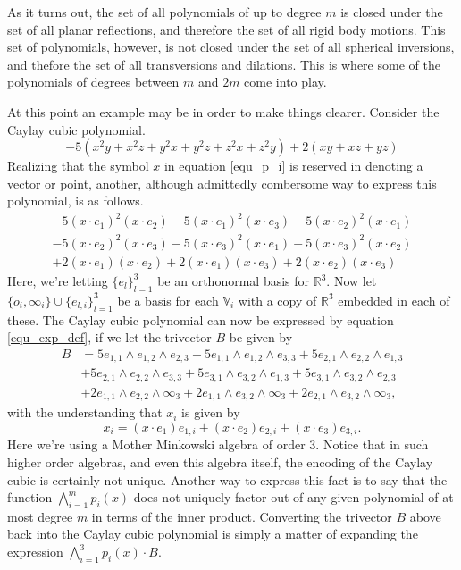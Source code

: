 \documentclass{birkjour}
\theoremstyle{definition}
\theoremstyle{remark}
\numberwithin{equation}{section}
\newcommand{\R}{\mathbb{R}}
\newcommand{\V}{\mathbb{V}}
\newcommand{\nvai}{\infty}
\newcommand{\nvao}{o}
\begin{document}
As it turns out, the set of all polynomials of up to degree $m$ is closed under
the set of all planar reflections, and therefore the set of all
rigid body motions.  This set of polynomials, however, is not closed under the
set of all spherical inversions, and thefore the set of all
transversions and dilations.  This is where some of the polynomials of degrees
between $m$ and $2m$ come into play.

At this point an example may be in order to make things clearer.
Consider the Caylay cubic polynomial.
\begin{equation*}
-5(x^2y + x^2z + y^2x + y^2z + z^2x + z^2y) + 2(xy + xz + yz)
\end{equation*}
Realizing that the symbol $x$ in equation \eqref{equ_p_i} is reserved in denoting
a vector or point, another, although admittedly combersome way to express this polynomial, is as follows.
\begin{align*}
-5(x\cdot e_1)^2(x\cdot e_2) - 5(x\cdot e_1)^2(x\cdot e_3) -5(x\cdot e_2)^2(x\cdot e_1) \\
 -5 (x\cdot e_2)^2(x\cdot e_3) -5(x\cdot e_3)^2(x\cdot e_1) -5 (x\cdot e_3)^2(x\cdot e_2) \\
+ 2(x\cdot e_1)(x\cdot e_2) + 2(x\cdot e_1)(x\cdot e_3) + 2(x\cdot e_2)(x\cdot e_3)
\end{align*}
Here, we're letting $\{e_l\}_{l=1}^3$ be an orthonormal basis for $\R^3$.  Now let
$\{\nvao_i,\nvai_i\}\cup\{e_{l,i}\}_{l=1}^3$ be a basis for each $\V_i$ with a copy of $\R^3$
embedded in each of these.  The Caylay cubic polynomial can now be expressed by
equation \eqref{equ_exp_def}, if we let the trivector $B$ be given by
\begin{align*}
B &= 5e_{1,1}\wedge e_{1,2}\wedge e_{2,3} + 5e_{1,1}\wedge e_{1,2}\wedge e_{3,3} + 5e_{2,1}\wedge e_{2,2}\wedge e_{1,3} \\
 &+ 5e_{2,1}\wedge e_{2,2}\wedge e_{3,3} + 5e_{3,1}\wedge e_{3,2}\wedge e_{1,3} + 5e_{3,1}\wedge e_{3,2}\wedge e_{2,3} \\
 & +2e_{1,1}\wedge e_{2,2}\wedge \nvai_{3} + 2e_{1,1}\wedge e_{3,2}\wedge \nvai_{3} + 2e_{2,1}\wedge e_{3,2}\wedge \nvai_{3},
\end{align*}
with the understanding that $x_i$ is given by
\begin{equation*}
x_i = (x\cdot e_1)e_{1,i} + (x\cdot e_2)e_{2,i} + (x\cdot e_3)e_{3,i}.
\end{equation*}
Here we're using a Mother Minkowski algebra of order 3.  Notice that in such higher order
algebras, and even this algebra itself, the encoding of the Caylay cubic is certainly not unique.
Another way to express this fact is to say that the function $\bigwedge_{i=1}^m p_i(x)$ does
not uniquely factor out of any given polynomial of at most degree $m$ in terms of the inner product.
Converting the trivector $B$ above back into the Caylay cubic polynomial is simply a matter
of expanding the expression $\bigwedge_{i=1}^3 p_i(x)\cdot B$.
\end{document}
